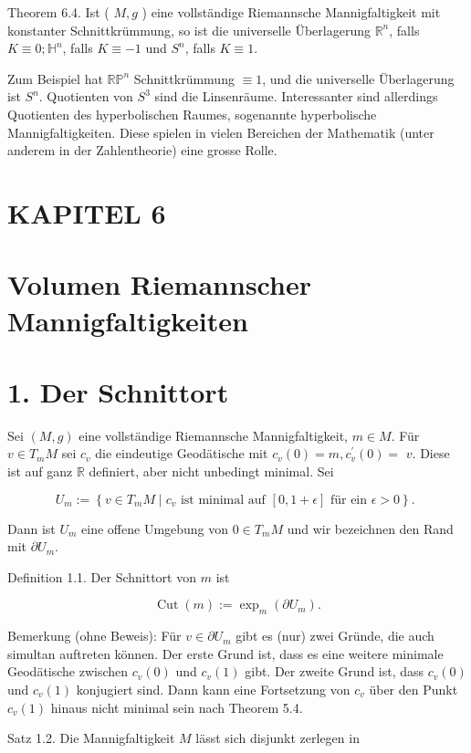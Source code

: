 \documentclass[10pt, letterpaper]{article}
\begin{document}
Theorem 6.4. Ist ( $M, g$ ) eine vollständige Riemannsche Mannigfaltigkeit mit konstanter Schnittkrümmung, so ist die universelle Überlagerung $\mathbb{R}^{n}$, falls $K \equiv 0 ; \mathbb{H}^{n}$, falls $K \equiv-1$ und $S^{n}$, falls $K \equiv 1$.

Zum Beispiel hat $\mathbb{R P}^{n}$ Schnittkrümmung $\equiv 1$, und die universelle Überlagerung ist $S^{n}$. Quotienten von $S^{3}$ sind die Linsenräume. Interessanter sind allerdings Quotienten des hyperbolischen Raumes, sogenannte hyperbolische Mannigfaltigkeiten. Diese spielen in vielen Bereichen der Mathematik (unter anderem in der Zahlentheorie) eine grosse Rolle.

\section*{KAPITEL 6}
\section*{Volumen Riemannscher Mannigfaltigkeiten}
\section*{1. Der Schnittort}
Sei $(M, g)$ eine vollständige Riemannsche Mannigfaltigkeit, $m \in M$. Für $v \in T_{m} M$ sei $c_{v}$ die eindeutige Geodätische mit $c_{v}(0)=m, c_{v}^{\prime}(0)=$ $v$. Diese ist auf ganz $\mathbb{R}$ definiert, aber nicht unbedingt minimal. Sei

$$
U_{m}:=\left\{v \in T_{m} M \mid c_{v} \text { ist minimal auf }[0,1+\epsilon] \text { für ein } \epsilon>0\right\} \text {. }
$$

Dann ist $U_{m}$ eine offene Umgebung von $0 \in T_{m} M$ und wir bezeichnen den Rand mit $\partial U_{m}$.

Definition 1.1. Der Schnittort von $m$ ist

$$
\operatorname{Cut}(m):=\exp _{m}\left(\partial U_{m}\right) .
$$

Bemerkung (ohne Beweis): Für $v \in \partial U_{m}$ gibt es (nur) zwei Gründe, die auch simultan auftreten können. Der erste Grund ist, dass es eine weitere minimale Geodätische zwischen $c_{v}(0)$ und $c_{v}(1)$ gibt. Der zweite Grund ist, dass $c_{v}(0)$ und $c_{v}(1)$ konjugiert sind. Dann kann eine Fortsetzung von $c_{v}$ über den Punkt $c_{v}(1)$ hinaus nicht minimal sein nach Theorem 5.4.

Satz 1.2. Die Mannigfaltigkeit $M$ lässt sich disjunkt zerlegen in
\end{document}
